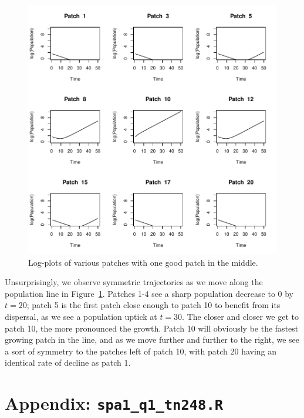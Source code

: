 \documentclass[10pt, oneside, reqno]{article}
\theoremstyle{plain}
\begin{document}
\begin{figure}
\begin{center}
\includegraphics{spa1_tn248-popplot3}
\end{center}
\caption{Log-plots of various patches with one good patch in the middle.}
\label{fig:popplot3}
\end{figure}

Unsurprisingly, we observe symmetric trajectories as we move along the population line in Figure~\ref{fig:popplot3}. Patches 1-4 see a sharp population decrease to 0 by $t=20$; patch 5 is the first patch close enough to patch 10 to benefit from its dispersal, as we see a population uptick at $t=30$. The closer and closer we get to patch 10, the more pronounced the growth. Patch 10 will obviously be the fastest growing patch in the line, and as we move further and further to the right, we see a sort of symmetry to the patches left of patch 10, with patch 20 having an identical rate of decline as patch 1. 
\newpage
\section{Appendix: \texttt{spa1\_q1\_tn248.R}} %
\label{sec:appendix_1}
\end{document}
